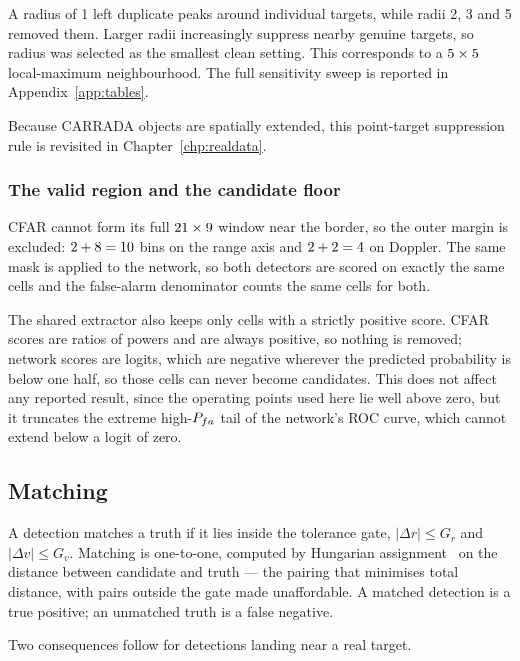 A radius of 1 left duplicate peaks around individual targets, while radii 2, 3 and 5 removed them.
Larger radii increasingly suppress nearby genuine targets, so radius \ProtocolNms{} was selected as
the smallest clean setting. This corresponds to a
$5 \times 5$ local-maximum neighbourhood. The full sensitivity sweep is
reported in Appendix~\ref{app:tables}.

Because CARRADA objects are spatially extended, this point-target suppression rule is revisited in
Chapter~\ref{chp:realdata}.

\subsubsection*{The valid region and the candidate floor}

CFAR cannot form its full $21 \times 9$ window near the border, so the outer margin is
excluded: $2 + 8 = 10$ bins on the range axis and
$2 + 2 = 4$ on Doppler. The same mask is applied to the network, so both
detectors are scored on exactly the same cells and the false-alarm denominator counts the same cells
for both.

The shared extractor also keeps only cells with a strictly positive score. CFAR scores are ratios of
powers and are always positive, so nothing is removed; network scores are logits, which are negative
wherever the predicted probability is below one half, so those cells can never become candidates.
This does not affect any reported result, since the operating points used here lie well above zero,
but it truncates the extreme high-$P_{fa}$ tail of the network's ROC curve, which cannot extend below a
logit of zero.

\subsection{Matching}
\label{sec:matching}

A detection matches a truth if it lies inside the tolerance gate,
$|\Delta r| \le G_r$ and $|\Delta v| \le G_v$. Matching is one-to-one, computed by Hungarian
assignment~\cite{kuhn1955hungarian} on the distance between candidate and truth --- the pairing that minimises total distance,
with pairs outside the gate made unaffordable. A matched detection is a true positive; an unmatched
truth is a false negative.

Two consequences follow for detections landing near a real target.

